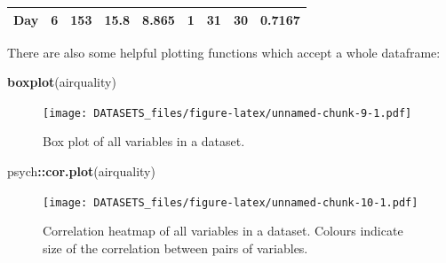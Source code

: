 \documentclass[]{article}
\newenvironment{Shaded}{\begin{snugshade}}{\end{snugshade}}
\newcommand{\KeywordTok}[1]{\textcolor[rgb]{0.13,0.29,0.53}{\textbf{#1}}}
\newcommand{\OperatorTok}[1]{\textcolor[rgb]{0.81,0.36,0.00}{\textbf{#1}}}
\newcommand{\NormalTok}[1]{#1}
\theoremstyle{definition}
\theoremstyle{definition}
\theoremstyle{definition}
\theoremstyle{remark}
\begin{document}
\begin{longtable}[]{@{}ccccccccc@{}}
\begin{minipage}[t]{0.15\columnwidth}
\textbf{Day}\strut
\end{minipage} & \begin{minipage}[t]{0.07\columnwidth}\centering\strut
6\strut
\end{minipage} & \begin{minipage}[t]{0.06\columnwidth}\centering\strut
153\strut
\end{minipage} & \begin{minipage}[t]{0.08\columnwidth}\centering\strut
15.8\strut
\end{minipage} & \begin{minipage}[t]{0.08\columnwidth}\centering\strut
8.865\strut
\end{minipage} & \begin{minipage}[t]{0.06\columnwidth}\centering\strut
1\strut
\end{minipage} & \begin{minipage}[t]{0.07\columnwidth}\centering\strut
31\strut
\end{minipage} & \begin{minipage}[t]{0.08\columnwidth}\centering\strut
30\strut
\end{minipage} & \begin{minipage}[t]{0.08\columnwidth}\centering\strut
0.7167\strut
\end{minipage}\tabularnewline
\bottomrule
\end{longtable}

There are also some helpful plotting functions which accept a whole
dataframe:

\begin{Shaded}
\begin{Highlighting}[]
\KeywordTok{boxplot}\NormalTok{(airquality)}
\end{Highlighting}
\end{Shaded}

\begin{figure}
\centering
\texttt{[image: DATASETS\_files/figure-latex/unnamed-chunk-9-1.pdf]}
\caption{\label{fig:unnamed-chunk-9}Box plot of all variables in a dataset.}
\end{figure}

\begin{Shaded}
\begin{Highlighting}[]
\NormalTok{psych}\OperatorTok{::}\KeywordTok{cor.plot}\NormalTok{(airquality)}
\end{Highlighting}
\end{Shaded}

\begin{figure}
\centering
\texttt{[image: DATASETS\_files/figure-latex/unnamed-chunk-10-1.pdf]}
\caption{\label{fig:unnamed-chunk-10}Correlation heatmap of all variables in
a dataset. Colours indicate size of the correlation between pairs of
variables.}
\end{figure}
\end{document}
